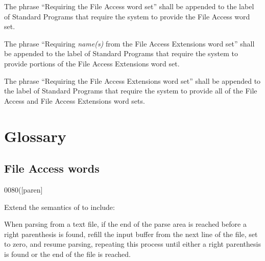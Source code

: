 The phrase ``Requiring the File Access word set'' shall be appended
to the label of Standard Programs that require the system to provide
the File Access word set.

The phrase ``Requiring \emph{name(s)} from the File Access Extensions
word set'' shall be appended to the label of Standard Programs that
require the system to provide portions of the File Access Extensions
word set.

The phrase ``Requiring the File Access Extensions word set'' shall be
appended to the label of Standard Programs that require the system to
provide all of the File Access and File Access Extensions word sets.


\section{Glossary} %
\vspace{1ex}
\subsection{File Access words} %
\vspace{1ex}
\begin{worddef}[p]{0080}{(}[paren]
\item {}

	Extend the semantics of  to include:

	When parsing from a text file, if the end of the parse area is
	reached before a right parenthesis is found, refill the input
	buffer from the next line of the file, set  to
	zero, and resume parsing, repeating this process until either a
	right parenthesis is found or the end of the file is reached.

	\begin{testing} %
	\end{testing}
\end{worddef}


